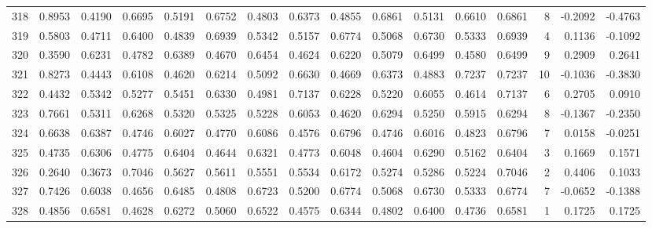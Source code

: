 \begin{tabular}{lrrrrrrrrrrrrrrr}
318 &      0.8953 &  0.4190 &  0.6695 &  0.5191 &  0.6752 &  0.4803 &  0.6373 &  0.4855 &  0.6861 &  0.5131 &   0.6610 &     0.6861 &      8 &                   -0.2092 &                    -0.4763 \\
319 &      0.5803 &  0.4711 &  0.6400 &  0.4839 &  0.6939 &  0.5342 &  0.5157 &  0.6774 &  0.5068 &  0.6730 &   0.5333 &     0.6939 &      4 &                    0.1136 &                    -0.1092 \\
320 &      0.3590 &  0.6231 &  0.4782 &  0.6389 &  0.4670 &  0.6454 &  0.4624 &  0.6220 &  0.5079 &  0.6499 &   0.4580 &     0.6499 &      9 &                    0.2909 &                     0.2641 \\
321 &      0.8273 &  0.4443 &  0.6108 &  0.4620 &  0.6214 &  0.5092 &  0.6630 &  0.4669 &  0.6373 &  0.4883 &   0.7237 &     0.7237 &     10 &                   -0.1036 &                    -0.3830 \\
322 &      0.4432 &  0.5342 &  0.5277 &  0.5451 &  0.6330 &  0.4981 &  0.7137 &  0.6228 &  0.5220 &  0.6055 &   0.4614 &     0.7137 &      6 &                    0.2705 &                     0.0910 \\
323 &      0.7661 &  0.5311 &  0.6268 &  0.5320 &  0.5325 &  0.5228 &  0.6053 &  0.4620 &  0.6294 &  0.5250 &   0.5915 &     0.6294 &      8 &                   -0.1367 &                    -0.2350 \\
324 &      0.6638 &  0.6387 &  0.4746 &  0.6027 &  0.4770 &  0.6086 &  0.4576 &  0.6796 &  0.4746 &  0.6016 &   0.4823 &     0.6796 &      7 &                    0.0158 &                    -0.0251 \\
325 &      0.4735 &  0.6306 &  0.4775 &  0.6404 &  0.4644 &  0.6321 &  0.4773 &  0.6048 &  0.4604 &  0.6290 &   0.5162 &     0.6404 &      3 &                    0.1669 &                     0.1571 \\
326 &      0.2640 &  0.3673 &  0.7046 &  0.5627 &  0.5611 &  0.5551 &  0.5534 &  0.6172 &  0.5274 &  0.5286 &   0.5224 &     0.7046 &      2 &                    0.4406 &                     0.1033 \\
327 &      0.7426 &  0.6038 &  0.4656 &  0.6485 &  0.4808 &  0.6723 &  0.5200 &  0.6774 &  0.5068 &  0.6730 &   0.5333 &     0.6774 &      7 &                   -0.0652 &                    -0.1388 \\
328 &      0.4856 &  0.6581 &  0.4628 &  0.6272 &  0.5060 &  0.6522 &  0.4575 &  0.6344 &  0.4802 &  0.6400 &   0.4736 &     0.6581 &      1 &                    0.1725 &                     0.1725 \\

\end{tabular}
